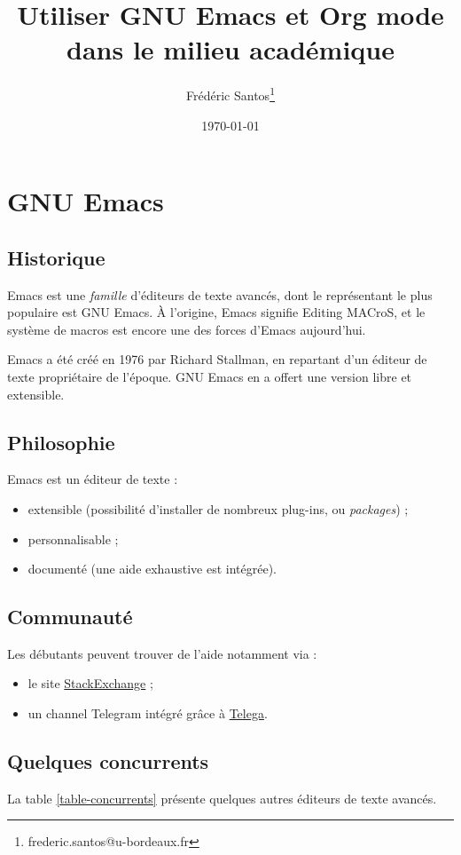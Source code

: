 \documentclass[11pt]{article}
\author{Frédéric Santos\thanks{frederic.santos@u-bordeaux.fr}}
\date{\today}
\title{Utiliser GNU Emacs et Org mode dans le milieu académique}
\begin{document}
\maketitle
\tableofcontents


\section{GNU Emacs}
\label{sec:orgd335271}
\subsection{Historique}
\label{sec:orgf1d1849}
Emacs est une \emph{famille} d'éditeurs de texte avancés, dont le représentant le plus populaire est GNU Emacs. À l'origine, \og Emacs\fg{} signifie \og Editing MACroS\fg{}, et le système de macros est encore une des forces d'Emacs aujourd'hui.

Emacs a été créé en 1976 par Richard Stallman, en repartant d'un éditeur de texte propriétaire de l'époque. GNU Emacs en a offert une version libre et extensible.

\subsection{Philosophie}
\label{sec:orgea11323}
Emacs est un éditeur de texte :
\begin{itemize}
\item extensible (possibilité d'installer de nombreux plug-ins, ou \emph{packages}) ;
\item personnalisable ;
\item documenté (une aide exhaustive est intégrée).
\end{itemize}

\subsection{Communauté}
\label{sec:org7738f39}
Les débutants peuvent trouver de l'aide notamment via :
\begin{itemize}
\item le site \href{https://emacs.stackexchange.com/}{StackExchange} ;
\item un channel Telegram intégré grâce à \href{https://zevlg.github.io/telega.el/}{Telega}.
\end{itemize}

\subsection{Quelques concurrents}
\label{sec:org0b1262e}
La table \ref{table-concurrents} présente quelques autres éditeurs de texte avancés.
\end{document}
